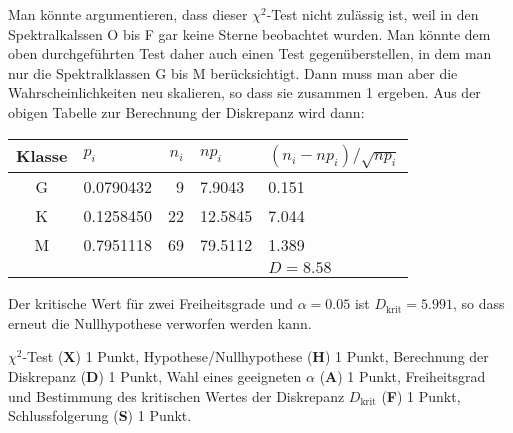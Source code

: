 \begin{diskussion}
Man könnte argumentieren, dass dieser $\chi^2$-Test nicht zulässig ist,
weil in den Spektralkalssen O bis F gar keine Sterne beobachtet wurden.
Man könnte dem oben durchgeführten Test daher auch einen Test
gegenüberstellen, in dem man nur die Spektralklassen G bis M berücksichtigt.
Dann muss man aber die Wahrscheinlichkeiten neu skalieren, so dass sie
zusammen 1 ergeben.
Aus der obigen Tabelle zur Berechnung der Diskrepanz wird dann:
\begin{center}
\begin{tabular}{|c|l|r|l|l|}
\hline
Klasse&$p_i$    &$n_i$&$np_i$            &$(n_i-np_i)/\sqrt{np_i}$\\
\hline
   G  &0.0790432&    9&\phantom{0}7.9043 & 0.151\phantom{882     }\\
   K  &0.1258450&   22&12.5845           & 7.044\phantom{503     }\\
   M  &0.7951118&   69&79.5112           & 1.389\phantom{552     }\\
\hline
      &         &     &                  &$D=8.58$\\
\hline
\end{tabular}
\end{center}
%
%
Der kritische Wert für zwei Freiheitsgrade und $\alpha=0.05$ ist
$D_{\text{krit}}=5.991$,
so dass erneut die Nullhypothese verworfen werden kann.
\end{diskussion}

\begin{bewertung}
$\chi^2$-Test ({\bf X}) 1 Punkt,
Hypothese/Nullhypothese ({\bf H}) 1 Punkt,
Berechnung der Diskrepanz ({\bf D}) 1 Punkt,
Wahl eines geeigneten $\alpha$ ({\bf A}) 1 Punkt,
Freiheitsgrad und Bestimmung des kritischen Wertes der Diskrepanz
$D_{\text{krit}}$ ({\bf F}) 1 Punkt,
Schlussfolgerung ({\bf S}) 1 Punkt.
\end{bewertung}


